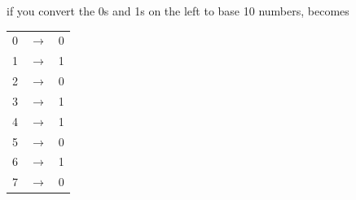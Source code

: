 if you convert the 0s and 1s on the left to base 10 numbers, becomes

\begin{center}
\begin{tabular}{rcl}
0 & $\rightarrow$ & 0 \\
1 & $\rightarrow$ & 1 \\
2 & $\rightarrow$ & 0 \\
3 & $\rightarrow$ & 1 \\
4 & $\rightarrow$ & 1 \\
5 & $\rightarrow$ & 0 \\
6 & $\rightarrow$ & 1 \\
7 & $\rightarrow$ & 0 \\
\end{tabular}
\end{center}

